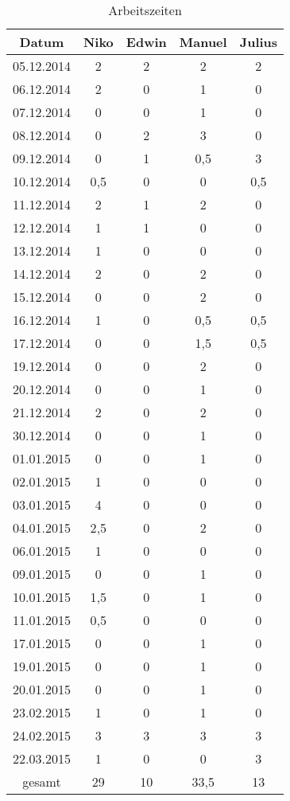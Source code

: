 \documentclass[a4paper, 11pt, titlepage]{article}
\begin{document}
\begin{table}[htbp]
\centering
\begin{tabular}{|c||c|c|c|c|}
\hline
Datum & Niko & Edwin & Manuel & Julius \\
\hline
\hline
05.12.2014 & 2 & 2 & 2 & 2 \\
\hline
06.12.2014 & 2 & 0 & 1 & 0 \\
\hline
07.12.2014 & 0 & 0 & 1 & 0 \\
\hline
08.12.2014 & 0 & 2 & 3 & 0 \\
\hline
09.12.2014 & 0 & 1 & 0{,}5 & 3 \\
\hline
10.12.2014 & 0{,}5 & 0 & 0 & 0{,}5 \\
\hline
11.12.2014 & 2 & 1 & 2 & 0 \\
\hline
12.12.2014 & 1 & 1 & 0 & 0 \\
\hline
13.12.2014 & 1 & 0 & 0 & 0 \\
\hline
14.12.2014 & 2 & 0 & 2 & 0 \\
\hline
15.12.2014 & 0 & 0 & 2 & 0 \\
\hline
16.12.2014 & 1 & 0 & 0{,}5 & 0{,}5 \\
\hline
17.12.2014 & 0 & 0 & 1{,}5 & 0{,}5 \\
\hline
19.12.2014 & 0 & 0 & 2 & 0 \\
\hline
20.12.2014 & 0 & 0 & 1 & 0 \\
\hline
21.12.2014 & 2 & 0 & 2 & 0 \\
\hline
30.12.2014 & 0 & 0 & 1 & 0 \\
\hline
01.01.2015 & 0 & 0 & 1 & 0 \\
\hline
02.01.2015 & 1 & 0 & 0 & 0 \\
\hline
03.01.2015 & 4 & 0 & 0 & 0 \\
\hline
04.01.2015 & 2{,}5 & 0 & 2 & 0 \\
\hline
06.01.2015 & 1 & 0 & 0 & 0 \\
\hline
09.01.2015 & 0 & 0 & 1 & 0 \\
\hline
10.01.2015 & 1{,}5 & 0 & 1 & 0 \\
\hline
11.01.2015 & 0{,}5 & 0 & 0 & 0 \\
\hline
17.01.2015 & 0 & 0 & 1 & 0 \\
\hline
19.01.2015 & 0 & 0 & 1 & 0 \\
\hline
20.01.2015 & 0 & 0 & 1 & 0 \\
\hline
23.02.2015 & 1 & 0 & 1 & 0 \\
\hline
24.02.2015 & 3 & 3 & 3 & 3 \\
\hline
22.03.2015 & 1 & 0 & 0 & 3 \\
\hline
\hline
gesamt & 29 & 10 & 33{,}5 & 13 \\
\hline
\end{tabular}
\caption{Arbeitszeiten}
\end{table}
\end{document}
